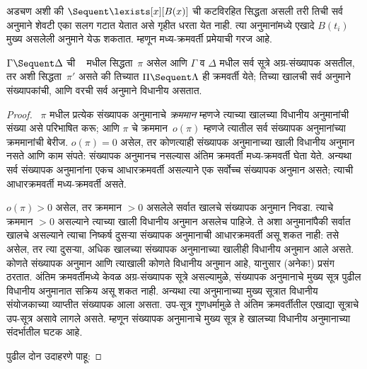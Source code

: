 अडचण अशी की
$\Sequent \lexists[x][B(x)]$
ची कटविरहित सिद्धता
असली तरी तिची सर्व
\RightR{\lexists} अनुमाने
शेवटी एका सलग गटात
येतात असे गृहीत धरता येत
नाही. त्या \RightR{\lexists}
अनुमानांमध्ये एखादे
$B(t_i)$ मुख्य असलेली
अनुमाने येऊ शकतात.
म्हणून मध्य-क्रमवर्ती
प्रमेयाची गरज आहे.

\begin{thm}[मध्य-क्रमवर्ती प्रमेय]\label{pt:cut:mid:thm:midsequent}
$\Gamma \Sequent \Delta$ ची
~ मधील
सिद्धता~$\pi$ असेल आणि
$\Gamma$ व $\Delta$ मधील
सर्व सूत्रे
अग्र-संख्यापक असतील,
तर अशी सिद्धता~$\pi'$
असते की तिच्यात
$\Pi \Sequent \Lambda$
ही क्रमवर्ती येते;
तिच्या खालची सर्व
अनुमाने संख्यापकांची,
आणि वरची सर्व अनुमाने
विधानीय असतात.
\end{thm}

\begin{proof}
  ~$\pi$ मधील प्रत्येक संख्यापक
  अनुमानाचे \emph{क्रममान} म्हणजे
  त्याच्या खालच्या विधानीय
  अनुमानांची संख्या असे
  परिभाषित करू; आणि
  $\pi$ चे क्रममान~$o(\pi)$
  म्हणजे त्यातील सर्व
  संख्यापक अनुमानांच्या
  क्रममानांची बेरीज.
  $o(\pi) = 0$ असेल, तर
  कोणत्याही संख्यापक
  अनुमानाच्या खाली विधानीय
  अनुमान नसते आणि काम संपते:
  संख्यापक अनुमानच नसल्यास
  अंतिम क्रमवर्ती मध्य-क्रमवर्ती
  घेता येते. अन्यथा सर्व
  संख्यापक अनुमानांना एकच
  आधारक्रमवर्ती असल्याने
  एक सर्वोच्च संख्यापक
  अनुमान असते; त्याची
  आधारक्रमवर्ती मध्य-क्रमवर्ती असते.

  $o(\pi) > 0$ असेल, तर
  क्रममान $>0$ असलेले सर्वात
  खालचे संख्यापक अनुमान
  निवडा. त्याचे क्रममान $>0$
  असल्याने त्याच्या खाली
  विधानीय अनुमान असलेच पाहिजे.
  ते अशा अनुमानांपैकी
  सर्वात खालचे असल्याने
  त्याचा निष्कर्ष दुसऱ्या
  संख्यापक अनुमानाची
  आधारक्रमवर्ती असू शकत
  नाही: तसे असेल, तर
  त्या दुसऱ्या, अधिक
  खालच्या संख्यापक अनुमानाच्या
  खालीही विधानीय अनुमान
  आले असते. कोणते
  संख्यापक अनुमान आणि
  त्याखाली कोणते विधानीय
  अनुमान आहे, यानुसार
  (अनेक!) प्रसंग ठरतात.
  अंतिम क्रमवर्तीमध्ये
  केवळ अग्र-संख्यापक
  सूत्रे असल्यामुळे,
  संख्यापक अनुमानाचे
  मुख्य सूत्र पुढील
  विधानीय अनुमानात
  सक्रिय असू शकत नाही.
  अन्यथा त्या अनुमानाच्या
  मुख्य सूत्रात विधानीय
  संयोजकाच्या व्याप्तीत
  संख्यापक आला असता.
  उप-सूत्र गुणधर्मामुळे
  ते अंतिम क्रमवर्तीतील
  एखाद्या सूत्राचे
  उप-सूत्र असावे लागले
  असते. म्हणून संख्यापक
  अनुमानाचे मुख्य
  सूत्र हे खालच्या
  विधानीय अनुमानाच्या
  संदर्भातील घटक आहे.

  पुढील दोन उदाहरणे पाहू:


\end{proof}
